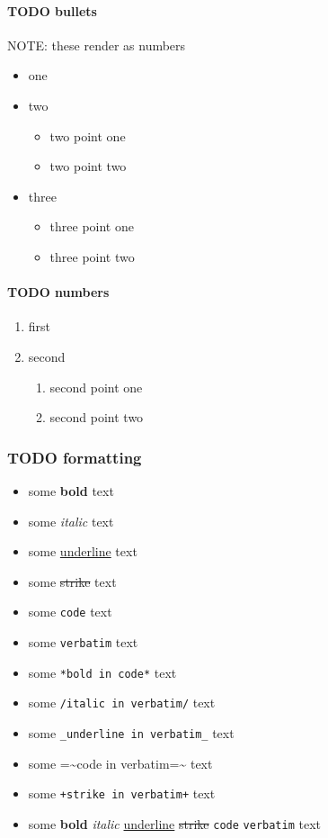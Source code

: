 \documentclass[11pt]{article}
\begin{document}
\paragraph{{\bfseries\sffamily TODO} bullets}
\label{sec:org84c1eb4}
NOTE: these render as numbers
\begin{itemize}
\item one
\item two
\begin{itemize}
\item two point one
\item two point two
\end{itemize}
\item three
\begin{itemize}
\item three point one
\item three point two
\end{itemize}
\end{itemize}
\paragraph{{\bfseries\sffamily TODO} numbers}
\label{sec:org92b8d85}
\begin{enumerate}
\item first
\item second
\begin{enumerate}
\item second point one
\item second point two
\end{enumerate}
\end{enumerate}
\subsubsection{{\bfseries\sffamily TODO} formatting}
\label{sec:org9d25407}
\begin{itemize}
\item some \textbf{bold} text
\item some \emph{italic} text
\item some \uline{underline} text
\item some \sout{strike} text
\item some \texttt{code} text
\item some \texttt{verbatim} text
\item some \texttt{*bold in code*} text
\item some \texttt{/italic in verbatim/} text
\item some \texttt{\_underline in verbatim\_} text
\item some =\textasciitilde{}code in verbatim=\textasciitilde{} text
\item some \texttt{+strike in verbatim+} text
\item some \textbf{bold} \emph{italic} \uline{underline} \sout{strike} \texttt{code} \texttt{verbatim} text
\end{itemize}
\end{document}
